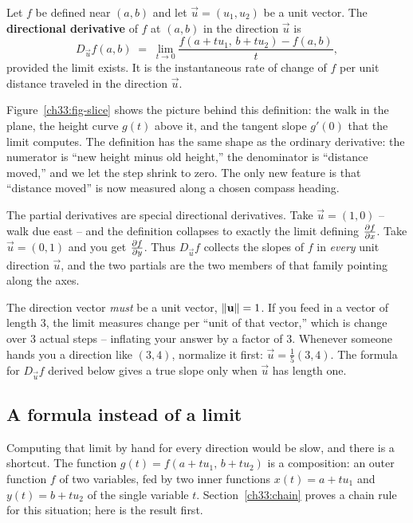 \begin{definition}
\label{ch33:def-dirderiv}
Let $f$ be defined near $(a,b)$ and let $\vec u=(u_1,u_2)$ be a unit vector. The
\textbf{directional derivative} of $f$ at $(a,b)$ in the direction $\vec u$ is
\[
  D_{\vec u} f(a,b) \;=\; \lim_{t\to 0}\frac{f(a+tu_1,\,b+tu_2)-f(a,b)}{t},
\]
provided the limit exists. It is the instantaneous rate of change of $f$ per unit
distance traveled in the direction $\vec u$.
\end{definition}

Figure~\ref{ch33:fig-slice} shows the picture behind this definition: the walk in
the plane, the height curve $g(t)$ above it, and the tangent slope $g'(0)$ that the
limit computes. The definition has the same shape as the ordinary derivative: the numerator
is ``new height minus old height,'' the denominator is ``distance moved,'' and we let
the step shrink to zero. The only new feature is that ``distance moved'' is now
measured along a chosen compass heading.

\begin{intuitionbox}
The partial derivatives are special directional derivatives. Take
$\vec u = (1,0)$ -- walk due east -- and the definition collapses to exactly the
limit defining $\frac{\partial f}{\partial x}$. Take $\vec u=(0,1)$ and you get $\frac{\partial f}{\partial y}$. Thus
$D_{\vec u} f$ collects the slopes of $f$ in \emph{every} unit direction $\vec u$, and the two partials are the
two members of that family pointing along the axes.
\end{intuitionbox}

\begin{trapbox}
The direction vector \emph{must} be a unit vector, $\lVert\mathbf{u}\rVert=1$. If you feed
in a vector of length $3$, the limit measures change per ``unit of that vector,''
which is change over $3$ actual steps -- inflating your answer by a factor of
$3$. Whenever someone hands you a direction like $(3,4)$, normalize it first:
$\vec u = \tfrac{1}{5}(3,4)$. The formula for $D_{\vec u}f$ derived below
gives a true slope only when $\vec u$ has length one.
\end{trapbox}

\subsection{A formula instead of a limit}

Computing that limit by hand for every direction would be slow, and there is a
shortcut. The function $g(t)=f(a+tu_1,\,b+tu_2)$ is a composition: an outer
function $f$ of two variables, fed by two inner functions
$x(t)=a+tu_1$ and $y(t)=b+tu_2$ of the single variable $t$. Section~\ref{ch33:chain}
proves a chain rule for this situation; here is the result first.

